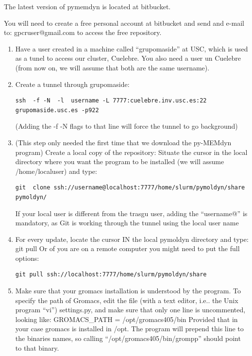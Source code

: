 \documentclass[10pt, oneside, pdftex]{article}
\begin{document}
The latest version of pymemdyn is located at bitbucket.

You will need to create a free personal account at bitbucket and send 
and e-mail to: gpcruser@gmail.com to access the free repository.



\begin{enumerate}
\item{Have  a user  created  in  a machine  called
``grupomaside'' at USC, which is used  as a tunel to access our cluster,
Cuelebre.  You also  need a  user un  Cuelebre (from  now on,  we will
assume that both are the same username).}

\item{Create a  tunnel through  grupomaside: 
\begin{Verbatim}
ssh  -f -N  -l  username -L 7777:cuelebre.inv.usc.es:22 grupomaside.usc.es -p922 
\end{Verbatim}
(Adding  the -f -N  flags to  that line  will force  the tunnel  to go
background)}

\item{(This  step  only needed  the  first  time  that we  download  the
py-MEMdyn program) Create a local  copy of the repository: Situate the
cursor  in  the local  directory  where you  want  the  program to  be
installed  (we  will  assume  /home/localuser)  and  type:
\begin{Verbatim}
git  clone ssh://username@localhost:7777/home/slurm/pymoldyn/share  pymoldyn/  
\end{Verbatim}
If your  local  user  is  different  from the  trasgu  user,  adding  the
``username@'' is mandatory,  as Git is working through  the tunnel using
the local user name}

\item{For every update, locate the cursor IN the local pymoldyn directory
and type: git pull  Or of you are on a remote  computer you might need
to       put       the        full       options:
\begin{Verbatim}
git pull ssh://localhost:7777/home/slurm/pymoldyn/share
\end{Verbatim}
}

\item{Make sure  that your  gromacs installation  is understood  by the
program. To  specify the path of  Gromacs, edit the file  (with a text
editor, i.e.. the  Unix program ``vi'') settings.py, and  make sure that
only   one  line   is  uncommented,   looking  like:   GROMACS\_PATH  =
/opt/gromacs405/bin Provided that in your case gromacs is installed in
/opt. The  program will  prepend this line  to the binaries  names, so
calling ``/opt/gromacs405/bin/grompp'' should point to that binary.}


\end{enumerate}
\end{document}

